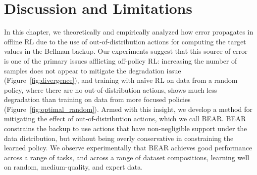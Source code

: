 \vspace{-0.2cm}
\section{Discussion and Limitations}
\vspace{-0.2cm}

In this chapter, we theoretically and empirically analyzed how error propagates in offline RL due to the use of out-of-distribution actions for computing the target values in the Bellman backup. Our experiments suggest that this source of error is one of the primary issues afflicting off-policy RL: increasing the number of samples does not appear to mitigate the degradation issue (Figure~\ref{fig:divergence}), and training with na\"{i}ve RL on data from a random policy, where there are no out-of-distribution actions, shows much less degradation than training on data from more focused policies (Figure~\ref{fig:optimal_random}). Armed with this insight, we develop a method for mitigating the effect of out-of-distribution actions, which we call BEAR. BEAR constrains the backup to use actions that have non-negligible support under the data distribution, but without being overly conservative in constraining the learned policy. We observe experimentally that BEAR achieves good performance across a range of tasks, and across a range of dataset compositions, learning well on random, medium-quality, and expert data.

